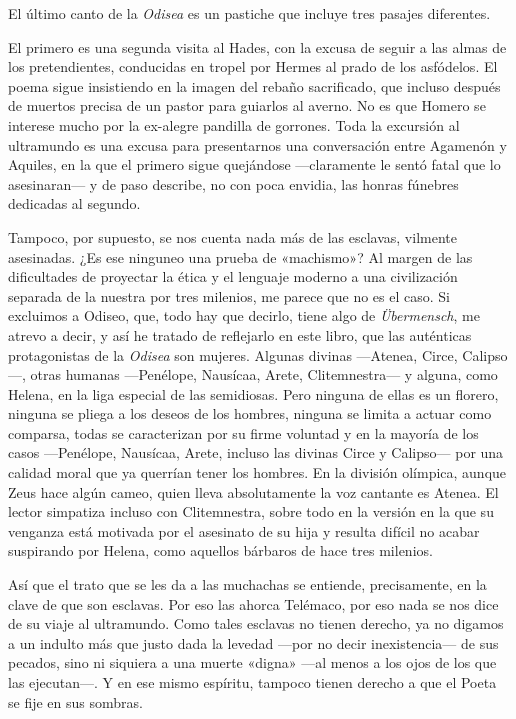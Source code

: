 
El último canto de la \emph{Odisea} es un pastiche que incluye tres pasajes diferentes.

El primero es una segunda visita al Hades, con la excusa de seguir a las almas de los pretendientes, conducidas en tropel por Hermes al prado de los asfódelos. El poema sigue insistiendo en la imagen del rebaño sacrificado, que incluso después de muertos precisa de un pastor para guiarlos al averno. No es que Homero se interese mucho por la ex-alegre pandilla de gorrones. Toda la excursión al ultramundo es una excusa para presentarnos una conversación entre Agamenón y Aquiles, en la que el primero sigue quejándose ---claramente le sentó fatal que lo asesinaran--- y de paso describe, no con poca envidia, las honras fúnebres dedicadas al segundo.

Tampoco, por supuesto, se nos cuenta nada más de las esclavas, vilmente asesinadas. ¿Es ese ninguneo una prueba de «machismo»? Al margen de las dificultades de proyectar la ética y el lenguaje moderno a una civilización separada de la nuestra por tres milenios, me parece que no es el caso. Si excluimos a Odiseo, que, todo hay que decirlo, tiene algo de \emph{Übermensch}, me atrevo a decir, y así he tratado de reflejarlo en este libro, que las auténticas protagonistas de la \emph{Odisea} son mujeres. Algunas divinas ---Atenea, Circe, Calipso---, otras humanas ---Penélope, Nausícaa, Arete, Clitemnestra--- y alguna, como Helena, en la liga especial de las semidiosas. Pero ninguna de ellas es un florero, ninguna se pliega a los deseos de los hombres, ninguna se limita a actuar como comparsa, todas se caracterizan por su firme voluntad y en la mayoría de los casos ---Penélope, Nausícaa, Arete, incluso las divinas Circe y Calipso--- por una calidad moral que ya querrían tener los hombres. En la división olímpica, aunque Zeus hace algún cameo, quien lleva absolutamente la voz cantante es Atenea. El lector simpatiza incluso con Clitemnestra, sobre todo en la versión en la que su venganza está motivada por el asesinato de su hija y resulta difícil no acabar suspirando por Helena, como aquellos bárbaros de hace tres milenios.

Así que el trato que se les da a las muchachas se entiende, precisamente, en la clave de que son esclavas. Por eso las ahorca Telémaco, por eso nada se nos dice de su viaje al ultramundo. Como tales esclavas no tienen derecho, ya no digamos a un indulto más que justo dada la levedad ---por no decir inexistencia--- de sus pecados, sino ni siquiera a una muerte «digna» ---al menos a los ojos de los que las ejecutan---. Y en ese mismo espíritu, tampoco tienen derecho a que el Poeta se fije en sus sombras.

